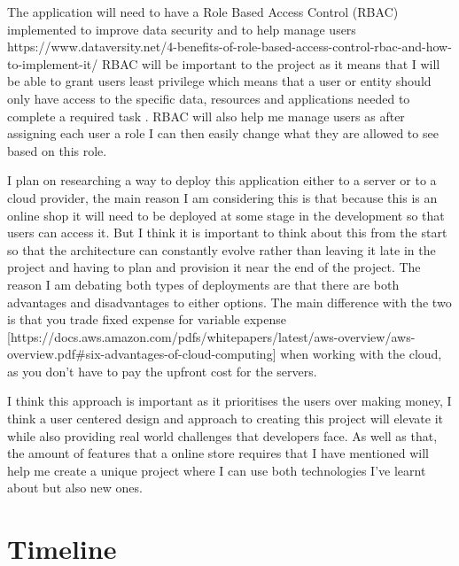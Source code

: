 \documentclass[]{project_report}
\begin{document}
The application will need to have a Role Based Access Control (RBAC) implemented to improve data security and to help manage users https://www.dataversity.net/4-benefits-of-role-based-access-control-rbac-and-how-to-implement-it/ RBAC will be important to the project as it means that I will be able to grant users least privilege which means that a user or entity should only have access to the specific data, resources and applications needed to complete a required task . RBAC will also help me manage users as after assigning each user a role I can then easily change what they are allowed to see based on this role. 


I plan on researching a way to deploy this application either to a server or to a cloud provider, the main reason I am considering this is that because this is an online shop it will need to be deployed at some stage in the development so that users can access it. But I think it is important to think about this from the start so that the architecture can constantly evolve rather than leaving it late in the project and having to plan and provision it near the end of the project. The reason I am debating both types of deployments are that there are both advantages and disadvantages to either options. The main difference with the two is that you trade fixed expense for variable expense [https://docs.aws.amazon.com/pdfs/whitepapers/latest/aws-overview/aws-overview.pdf#six-advantages-of-cloud-computing] when working with the cloud, as you don't have to pay the upfront cost for the servers.

I think this approach is important as it prioritises the users over making money, I think a user centered design and approach to creating this project will elevate it while also providing real world challenges that developers face. As well as that, the amount of features that a online store requires that I have mentioned will help me create a unique project where I can use both technologies I've learnt about but also new ones.

\newpage

\chapter{Timeline}
\end{document}
